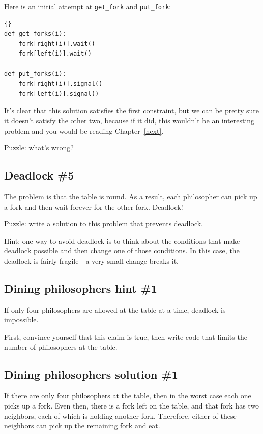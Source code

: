 \documentclass{book}
\newcommand{\clearemptydoublepage}{\newpage\cleardoublepage}
\begin{document}
Here is an initial attempt at {\tt get\_fork} and {\tt put\_fork}:

\begin{lstlisting}[title={Dining philosophers non-solution}]{}
def get_forks(i):
    fork[right(i)].wait()
    fork[left(i)].wait()

def put_forks(i):
    fork[right(i)].signal()
    fork[left(i)].signal()
\end{lstlisting}

It's clear that this solution satisfies the first constraint, but
we can be pretty sure it doesn't satisfy the other two, because
if it did, this wouldn't be an interesting problem and you would
be reading Chapter~\ref{next}.

Puzzle: what's wrong?


\clearemptydoublepage
\subsection{Deadlock \#5}

The problem is that the table is round.  As a result, each philosopher
can pick up a fork and then wait forever for the other fork.  Deadlock!

Puzzle: write a solution to this problem that prevents deadlock.

Hint: one way to avoid deadlock is to think about the conditions
that make deadlock possible and then change one of those conditions.
In this case, the deadlock is fairly fragile---a very small change
breaks it.

\clearemptydoublepage
\subsection{Dining philosophers hint \#1}

If only four philosophers are allowed at the table at a time,
deadlock is impossible.

First, convince yourself that this claim is true, then write code that
limits the number of philosophers at the table.


\clearemptydoublepage
\subsection{Dining philosophers solution \#1}

If there are only four philosophers at the table, then in the
worst case each one picks up a fork.  Even then, there is a fork
left on the table, and that fork has two neighbors, each of
which is holding another fork.  Therefore, either of these
neighbors can pick up the remaining fork and eat.
\end{document}
